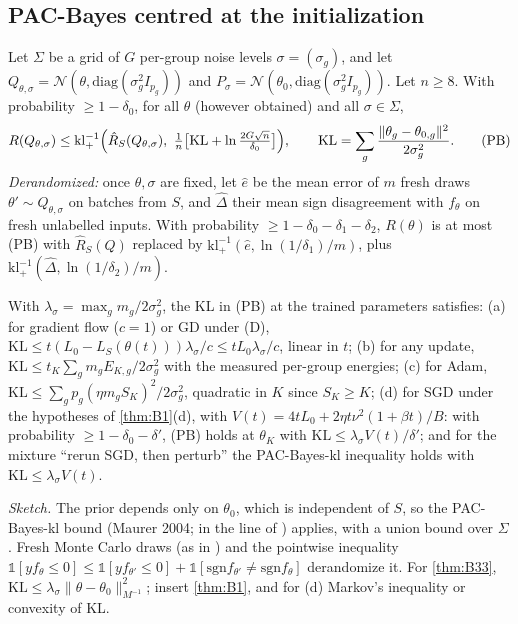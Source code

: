 \subsection{PAC-Bayes centred at the initialization}\label{app:networks:pacbayes}

\begin{theorem}[Theorem B3.2]\label{thm:B32}
Let $\Sigma$ be a grid of $G$ per-group noise levels $\sigma=(\sigma_g)$, and let $Q_{\theta,\sigma}=\mathcal N(\theta,\mathrm{diag}(\sigma_g^2I_{p_g}))$ and $P_\sigma=\mathcal N(\theta_0,\mathrm{diag}(\sigma_g^2I_{p_g}))$. Let $n\ge8$. With probability $\ge1-\delta_0$, for all $\theta$ (however obtained) and all $\sigma\in\Sigma$,
\[
R(Q_{\theta,\sigma})\le\mathrm{kl}^{-1}_+\Bigl(\hat R_S(Q_{\theta,\sigma}),\ \tfrac1n\bigl[\mathrm{KL}+\ln\tfrac{2G\sqrt n}{\delta_0}\bigr]\Bigr),\qquad \mathrm{KL}=\sum_g\frac{\|\theta_g-\theta_{0,g}\|^2}{2\sigma_g^2}. \tag{PB}
\]
\emph{Derandomized:} once $\theta,\sigma$ are fixed, let $\hat e$ be the mean error of $m$ fresh draws $\theta'\sim Q_{\theta,\sigma}$ on batches from $S$, and $\hat\Delta$ their mean sign disagreement with $f_\theta$ on fresh unlabelled inputs. With probability $\ge1-\delta_0-\delta_1-\delta_2$, $R(\theta)$ is at most (PB) with $\hat R_S(Q)$ replaced by $\mathrm{kl}^{-1}_+(\hat e,\ln(1/\delta_1)/m)$, plus $\mathrm{kl}^{-1}_+(\hat\Delta,\ln(1/\delta_2)/m)$.
\end{theorem}

\begin{theorem}\label{thm:B33}
With $\lambda_\sigma=\max_gm_g/2\sigma_g^2$, the KL in (PB) at the trained parameters satisfies:
(a) for gradient flow ($c=1$) or GD under (D), $\mathrm{KL}\le t(L_0-L_S(\theta(t)))\lambda_\sigma/c\le tL_0\lambda_\sigma/c$, linear in $t$;
(b) for any update, $\mathrm{KL}\le t_K\sum_gm_gE_{K,g}/2\sigma_g^2$ with the measured per-group energies;
(c) for Adam, $\mathrm{KL}\le\sum_gp_g(\eta m_gS_K)^2/2\sigma_g^2$, quadratic in $K$ since $S_K\ge K$;
(d) for SGD under the hypotheses of \cref{thm:B1}(d), with $V(t)=4tL_0+2\eta t\nu^2(1+\beta t)/B$: with probability $\ge1-\delta_0-\delta'$, (PB) holds at $\theta_K$ with $\mathrm{KL}\le\lambda_\sigma V(t)/\delta'$; and for the mixture ``rerun SGD, then perturb'' the PAC-Bayes-kl inequality holds with $\mathrm{KL}\le\lambda_\sigma V(t)$.
\end{theorem}
\noindent\emph{Sketch.} The prior depends only on $\theta_0$, which is independent of $S$, so the PAC-Bayes-kl bound (Maurer 2004; in the line of \cite{mcallester1999pacbayes}) applies, with a union bound over $\Sigma$. Fresh Monte Carlo draws (as in \cite{dziugaite2017computing}) and the pointwise inequality $\mathbb 1[yf_\theta\le0]\le\mathbb 1[yf_{\theta'}\le0]+\mathbb 1[\mathrm{sgn}f_{\theta'}\ne\mathrm{sgn}f_\theta]$ derandomize it. For \cref{thm:B33}, $\mathrm{KL}\le\lambda_\sigma\|\theta-\theta_0\|^2_{M^{-1}}$; insert \cref{thm:B1}, and for (d) Markov's inequality or convexity of KL.

